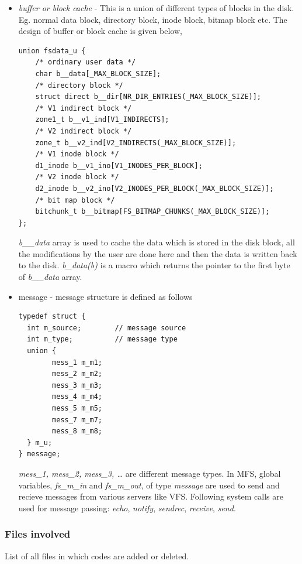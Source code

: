 \begin{itemize}
\item \emph{buffer or block cache} - This is a union of different types of
blocks in the disk. Eg. normal data block, directory block, inode block, bitmap
block etc. The design of buffer or block cache is given below,

\begin{lstlisting}
union fsdata_u {
	/* ordinary user data */
	char b__data[_MAX_BLOCK_SIZE]; 
	/* directory block */
	struct direct b__dir[NR_DIR_ENTRIES(_MAX_BLOCK_SIZE)];
	/* V1 indirect block */
	zone1_t b__v1_ind[V1_INDIRECTS];
	/* V2 indirect block */
	zone_t b__v2_ind[V2_INDIRECTS(_MAX_BLOCK_SIZE)];
	/* V1 inode block */
	d1_inode b__v1_ino[V1_INODES_PER_BLOCK];
	/* V2 inode block */
	d2_inode b__v2_ino[V2_INODES_PER_BLOCK(_MAX_BLOCK_SIZE)];
	/* bit map block */
	bitchunk_t b__bitmap[FS_BITMAP_CHUNKS(_MAX_BLOCK_SIZE)];
};

\end{lstlisting}
\emph{b\_\_data} array is used to cache the data which is stored in the disk
block, all the modifications by the user are done here and then the data is
written back to the disk. \emph{b\_data(b)} is a macro which returns the pointer
to the first byte of \emph{b\_\_data} array.

\item message - message structure is defined as follows
\begin{lstlisting}
typedef struct {
  int m_source;        // message source 
  int m_type;          // message type
  union {
        mess_1 m_m1;
        mess_2 m_m2;
        mess_3 m_m3;
        mess_4 m_m4;
        mess_5 m_m5;
        mess_7 m_m7;
        mess_8 m_m8;
  } m_u;
} message;
\end{lstlisting} 

\emph{mess\_1, mess\_2, mess\_3, \ldots} are different message types. In MFS,
global variables, \emph{fs\_m\_in} and \emph{fs\_m\_out}, of type \emph{message}
are used to send and recieve messages from various servers like VFS. Following
system calls are used for message passing: \emph{echo}, \emph{notify},
\emph{sendrec}, \emph{receive}, \emph{send}.
\end{itemize}

\newpage
\subsubsection{Files involved}
List of all files in which codes are added or deleted.

